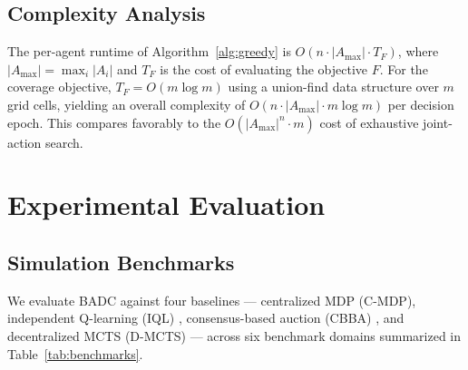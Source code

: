 \documentclass[12pt,oneside]{report}
\theoremstyle{definition}
\theoremstyle{remark}
\begin{document}
\section{Complexity Analysis}

The per-agent runtime of Algorithm~\ref{alg:greedy} is $O(n \cdot |A_{\max}| \cdot T_F)$,
where $|A_{\max}| = \max_i |A_i|$ and $T_F$ is the cost of evaluating the
objective $F$. For the coverage objective, $T_F = O(m \log m)$ using a
union-find data structure over $m$ grid cells, yielding an overall complexity
of $O(n \cdot |A_{\max}| \cdot m \log m)$ per decision epoch. This compares
favorably to the $O(|A_{\max}|^n \cdot m)$ cost of exhaustive joint-action search.

\chapter{Experimental Evaluation}
\label{ch:evaluation}

\section{Simulation Benchmarks}

We evaluate BADC against four baselines --- centralized MDP (C-MDP), independent
Q-learning (IQL) \citep{tan1993multi}, consensus-based auction (CBBA)
\citep{choi2009consensus}, and decentralized MCTS (D-MCTS)
\citep{claes2017decentralized} --- across six benchmark domains summarized in
Table~\ref{tab:benchmarks}.
\end{document}
